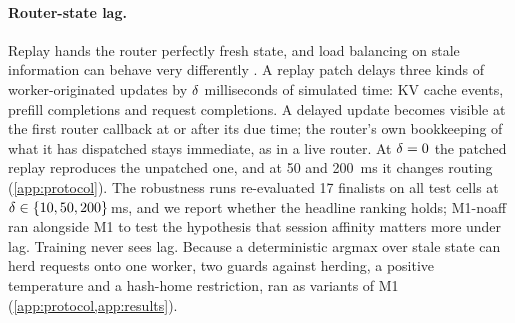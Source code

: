 \paragraph{Router-state lag.}
Replay hands the router perfectly fresh state, and load balancing on stale information can behave
very differently \citep{mitzenmacher1998old}. A replay patch delays three kinds of worker-originated
updates by $\delta$ milliseconds of simulated time: KV cache events, prefill completions and request
completions. A delayed update becomes visible at the first router callback at or after its due time;
the router's own bookkeeping of what it has dispatched stays immediate, as in a live router. At
$\delta = 0$ the patched replay reproduces the unpatched one, and at 50 and \SI{200}{ms} it changes
routing (\cref{app:protocol}). The robustness runs re-evaluated 17 finalists on all test cells at
$\delta \in \{10, 50, 200\}$\,ms, and we report whether the headline ranking holds; M1-noaff ran
alongside M1 to test the hypothesis that session affinity matters more under lag. Training never
sees lag.
Because a deterministic argmax over stale state can herd requests onto one worker, two guards
against herding, a positive temperature and a hash-home restriction, ran as variants of M1
(\cref{app:protocol,app:results}).

